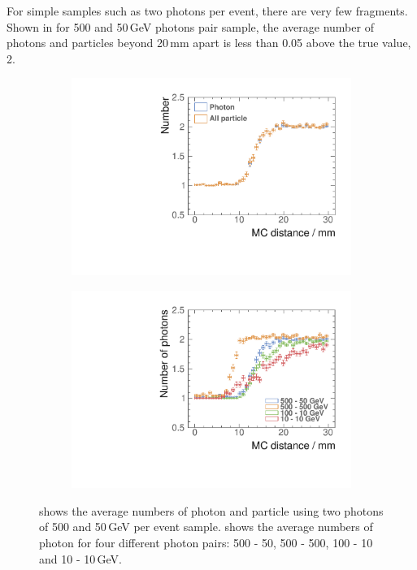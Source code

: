 For simple samples such as two photons per event, there are very few fragments. Shown in  for 500 and 50\,GeV photons pair sample, the average number of photons and particles beyond 20\,mm apart is less than 0.05 above the true value, 2.

\begin{figure}[tbph]
\centering
    \begin{subfigure}[b]{0.45\textwidth}
        \includegraphics[width=\textwidth]{photon/DoubleN_pN_all.pdf}
        \caption{}
        \label{fig:photonDoubleCompareN_pN_all}
    \end{subfigure}
    \begin{subfigure}[b]{0.45\textwidth}
        \includegraphics[width=\textwidth]{photon/DoubleCompareEnergies.pdf}
        \caption{}
        \label{fig:photonDoubleCompareEnergies}
    \end{subfigure}
\caption[Average numbers of photon and particle using two photons of 500 and 50\,GeV per event sample and with different energy pairs.]
{ shows the average numbers of photon and particle using two photons of 500 and 50\,GeV per event sample.  shows the  average numbers of photon for four different photon pairs: 500 - 50, 500 - 500, 100 - 10 and 10 - 10\,GeV.}
\label{fig:photonDoublePerformance}
\end{figure}

